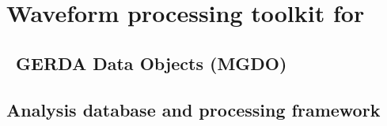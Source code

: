 
\chapter{Waveform processing toolkit for \MJ}
\label{app:MGDO}

	\section{\MJ~GERDA Data Objects (MGDO)}


    \section{Analysis database and processing framework}
